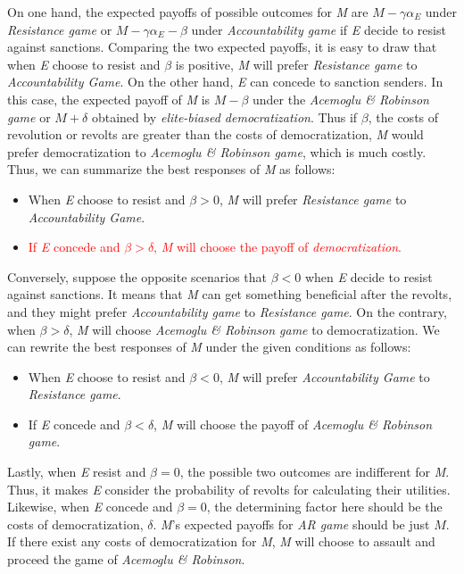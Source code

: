 \documentclass[11pt, letterpage]{article}
\begin{document}
On one hand, the expected payoffs of possible outcomes for \textit{M} are $M-\gamma\alpha_{E}$ under \textit{Resistance game} or $M-\gamma\alpha_{E}-\beta$ under \textit{Accountability game} if \textit{E} decide to resist against sanctions. Comparing the two expected payoffs, it is easy to draw that when \textit{E} choose to resist and $\beta$ is positive, \textit{M} will prefer \textit{Resistance game} to \textit{Accountability Game}. On the other hand, \textit{E} can concede to sanction senders. In this case, the expected payoff of \textit{M} is $M-\beta$ under the \textit{Acemoglu \& Robinson game} or $M+\delta$ obtained by \textit{elite-biased democratization}. Thus if $\beta$, the costs of revolution or revolts are greater than the costs of democratization, \textit{M} would prefer democratization to \textit{Acemoglu \& Robinson game}, which is much costly. Thus, we can summarize the best responses of \textit{M} as follows:

\begin{itemize}
	\item When \textit{E} choose to resist and $\beta > 0$, \textit{M} will prefer \textit{Resistance game} to \textit{Accountability Game}.
	\item \textcolor{red}{If \textit{E} concede and $\beta > \delta$, \textit{M} will choose the payoff of \textit{democratization}.}
\end{itemize}
	
Conversely, suppose the opposite scenarios that $\beta < 0$ when \textit{E} decide to resist against sanctions. It means that \textit{M} can get something beneficial after the revolts, and they might prefer \textit{Accountability game} to \textit{Resistance game}. On the contrary, when $\beta > \delta$, \textit{M} will choose \textit{Acemoglu \& Robinson game} to democratization. We can rewrite the best responses of \textit{M} under the given conditions as follows:

\begin{itemize}
	\item When \textit{E} choose to resist and $\beta < 0$, \textit{M} will prefer \textit{Accountability Game} to \textit{Resistance game}.
	\item If \textit{E} concede and $\beta < \delta$, \textit{M} will choose the payoff of \textit{Acemoglu \& Robinson game}.
\end{itemize}
	
Lastly, when \textit{E} resist and $\beta = 0$, the possible two outcomes are indifferent for \textit{M}. Thus, it makes \textit{E} consider the probability of revolts for calculating their utilities. Likewise, when \textit{E} concede and $\beta = 0$, the determining factor here should be the costs of democratization, $\delta$. \textit{M}'s expected payoffs for \textit{AR game} should be just $M$. If there exist any costs of democratization for \textit{M}, \textit{M} will choose to assault and proceed the game of \textit{Acemoglu \& Robinson}. 
	
\end{document}
